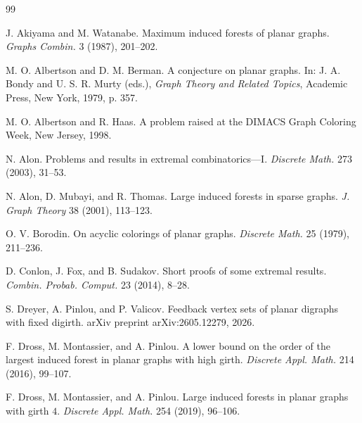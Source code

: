 \documentclass[a4paper,12pt]{article}
\theoremstyle{plain}
\theoremstyle{definition}
\theoremstyle{remark}
\numberwithin{equation}{section}
\begin{document}


{\footnotesize

\begin{thebibliography}{99}

J. Akiyama and M. Watanabe.
Maximum induced forests of planar graphs.
\emph{Graphs Combin.} 3 (1987), 201--202.


M. O. Albertson and D. M. Berman.
A conjecture on planar graphs.
In: J. A. Bondy and U. S. R. Murty (eds.),
\emph{Graph Theory and Related Topics},
Academic Press, New York, 1979, p. 357.


M. O. Albertson and R. Haas.
A problem raised at the DIMACS Graph Coloring Week, New Jersey, 1998.

N. Alon.
Problems and results in extremal combinatorics---I.
\emph{Discrete Math.} 273 (2003), 31--53.


N. Alon, D. Mubayi, and R. Thomas.
Large induced forests in sparse graphs.
\emph{J. Graph Theory} 38 (2001), 113--123.



O. V. Borodin.
On acyclic colorings of planar graphs.
\emph{Discrete Math.} 25 (1979), 211--236.

D. Conlon, J. Fox, and B. Sudakov.
Short proofs of some extremal results.
\emph{Combin. Probab. Comput.} 23 (2014), 8--28.

S. Dreyer, A. Pinlou, and P. Valicov.
Feedback vertex sets of planar digraphs with fixed digirth.
arXiv preprint arXiv:2605.12279, 2026.

F. Dross, M. Montassier, and A. Pinlou.
A lower bound on the order of the largest induced forest in planar graphs with high girth.
\emph{Discrete Appl. Math.} 214 (2016), 99--107.

F. Dross, M. Montassier, and A. Pinlou.
Large induced forests in planar graphs with girth $4$.
\emph{Discrete Appl. Math.} 254 (2019), 96--106.


\end{thebibliography}}
\end{document}
